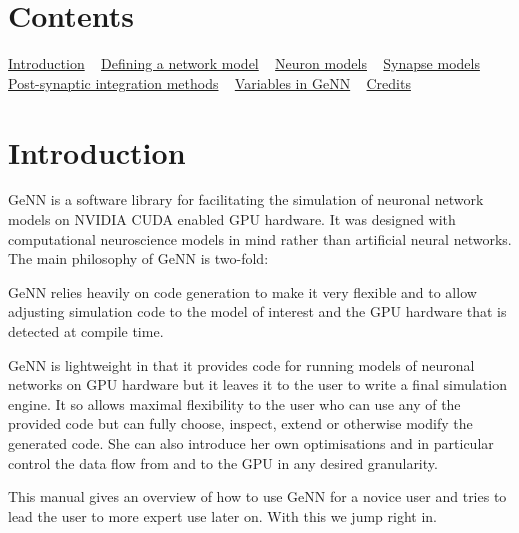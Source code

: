 \hypertarget{index_Contents}{}\section{Contents}\label{index_Contents}
\hyperlink{UserManual_sIntro}{Introduction} ~\newline
 \hyperlink{sect1}{Defining a network model} ~\newline
 \hyperlink{sect2}{Neuron models} ~\newline
 \hyperlink{sect3}{Synapse models} ~\newline
 \hyperlink{sect_postsyn}{Post-\/synaptic integration methods} ~\newline
 \hyperlink{ListOfVariables}{Variables in Ge\+N\+N} ~\newline
 \hyperlink{Credits}{Credits} ~\newline
\hypertarget{UserManual_sIntro}{}\section{Introduction}\label{UserManual_sIntro}
Ge\+N\+N is a software library for facilitating the simulation of neuronal network models on N\+V\+I\+D\+I\+A C\+U\+D\+A enabled G\+P\+U hardware. It was designed with computational neuroscience models in mind rather than artificial neural networks. The main philosophy of Ge\+N\+N is two-\/fold\+:
\begin{DoxyEnumerate}
\item Ge\+N\+N relies heavily on code generation to make it very flexible and to allow adjusting simulation code to the model of interest and the G\+P\+U hardware that is detected at compile time.
\item Ge\+N\+N is lightweight in that it provides code for running models of neuronal networks on G\+P\+U hardware but it leaves it to the user to write a final simulation engine. It so allows maximal flexibility to the user who can use any of the provided code but can fully choose, inspect, extend or otherwise modify the generated code. She can also introduce her own optimisations and in particular control the data flow from and to the G\+P\+U in any desired granularity.
\end{DoxyEnumerate}

This manual gives an overview of how to use Ge\+N\+N for a novice user and tries to lead the user to more expert use later on. With this we jump right in.

~\newline
 

